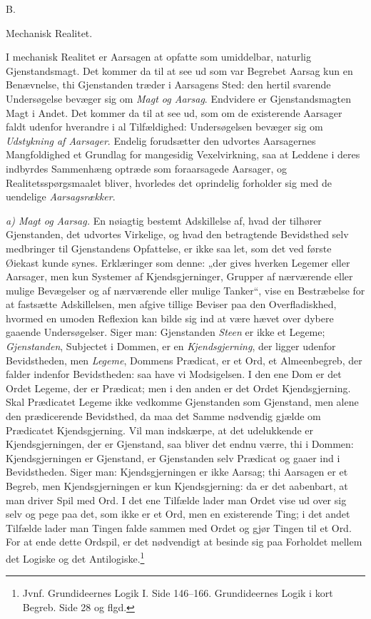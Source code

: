 \documentclass[12pt,a4paper]{book}
\newcommand{\afdeling}[2]{%
  \par\vspace{1.3\baselineskip}%
  {\centering #1\par\vspace{0.2\baselineskip}\normalsize #2\par}%
  \addcontentsline{toc}{section}{#1 #2}%
  \vspace{0.8\baselineskip}\par\nointerlineskip}
\newcommand{\runin}[1]{\emph{#1}\hspace{0.4em}}
\begin{document}
\afdeling{B.}{Mechanisk Realitet.}

I mechanisk Realitet er Aarsagen at opfatte som umiddelbar, naturlig
Gjenstandsmagt. Det kommer da til at see ud som var Begrebet Aarsag kun
en Benævnelse, thi Gjenstanden træder i Aarsagens Sted: den hertil
svarende Undersøgelse bevæger sig om \emph{Magt og Aarsag}. Endvidere er
Gjenstandsmagten Magt i Andet. Det kommer da til at see ud, som om de
existerende Aarsager faldt udenfor hverandre
i al Tilfældighed: Undersøgelsen bevæger sig om \emph{Udstykning af
Aarsager}. Endelig forudsætter den udvortes Aarsagernes Mangfoldighed et
Grundlag for mangesidig Vexelvirkning, saa at Leddene i deres indbyrdes
Sammenhæng optræde som foraarsagede Aarsager, og Realitetsspørgsmaalet
bliver, hvorledes det oprindelig forholder sig med de uendelige
\emph{Aarsagsrækker}.

\runin{a) Magt og Aarsag.} En nøiagtig bestemt Adskillelse af, hvad der
tilhører Gjenstanden, det udvortes Virkelige, og hvad den betragtende
Bevidsthed selv medbringer til Gjenstandens Opfattelse, er ikke saa let,
som det ved første Øiekast kunde synes. Erklæringer som denne: „der
gives hverken Legemer eller Aarsager, men kun Systemer af
Kjendsgjerninger, Grupper af nærværende eller mulige Bevægelser og af
nærværende eller mulige Tanker“, vise en Bestræbelse for at fastsætte
Adskillelsen, men afgive tillige Beviser paa den Overfladiskhed, hvormed
en umoden Reflexion kan bilde sig ind at være hævet over dybere gaaende
Undersøgelser. Siger man: Gjenstanden \emph{Steen} er ikke et Legeme;
\emph{Gjenstanden}, Subjectet i Dommen, er en \emph{Kjendsgjerning}, der
ligger udenfor Bevidstheden, men \emph{Legeme}, Dommens Prædicat, er et
Ord, et Almeenbegreb, der falder indenfor Bevidstheden: saa have vi
Modsigelsen. I den ene Dom er det Ordet Legeme, der er Prædicat; men i
den anden er det Ordet Kjendsgjerning. Skal Prædicatet Legeme ikke
vedkomme Gjenstanden som Gjenstand, men alene den prædicerende
Bevidsthed, da maa det Samme nødvendig gjælde om Prædicatet
Kjendsgjerning. Vil man indskærpe, at det udelukkende er
Kjendsgjerningen, der er Gjenstand, saa bliver det endnu værre, thi i
Dommen: Kjendsgjerningen er Gjenstand, er Gjenstanden selv Prædicat og
gaaer ind i Bevidstheden. Siger man: Kjendsgjerningen er ikke Aarsag;
thi Aarsagen er et Begreb, men Kjendsgjerningen er kun Kjendsgjerning:
da er det aabenbart, at
man driver Spil med Ord. I det ene Tilfælde lader man Ordet vise ud over
sig selv og pege paa det, som ikke er et Ord, men en existerende Ting; i
det andet Tilfælde lader man Tingen falde sammen med Ordet og gjør
Tingen til et Ord. For at ende dette Ordspil, er det nødvendigt at
besinde sig paa Forholdet mellem det Logiske og det
Antilogiske.\footnote{%
Jvnf. Grundideernes Logik I. Side 146--166. Grundideernes Logik i kort
Begreb. Side 28 og flgd.}
\end{document}
